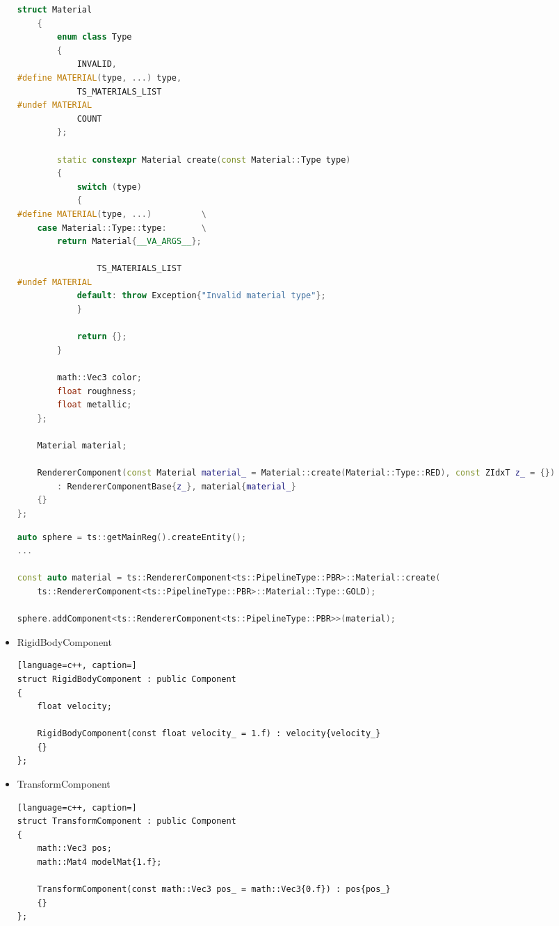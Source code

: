 \begin{itemize}
\begin{lstlisting}[language=c++, caption=Renderer PBR Component struct (./engine/include/tsengine/ecs/components/renderer\_component.h)]
    struct Material
    {
        enum class Type
        {
            INVALID,
#define MATERIAL(type, ...) type, 
            TS_MATERIALS_LIST
#undef MATERIAL
            COUNT
        };

        static constexpr Material create(const Material::Type type)
        {
            switch (type)
            {
#define MATERIAL(type, ...)          \
    case Material::Type::type:       \
        return Material{__VA_ARGS__};

                TS_MATERIALS_LIST
#undef MATERIAL
            default: throw Exception{"Invalid material type"};
            }

            return {};
        }

        math::Vec3 color;
        float roughness;
        float metallic;
    };

    Material material;

    RendererComponent(const Material material_ = Material::create(Material::Type::RED), const ZIdxT z_ = {})
        : RendererComponentBase{z_}, material{material_}
    {}
};
\end{lstlisting}

\label{lst:renderer_component_pbr}
\begin{lstlisting}[language=c++, caption=Process of adding PBR Renderer Component with material (./game/game.cpp)]
auto sphere = ts::getMainReg().createEntity();
...

const auto material = ts::RendererComponent<ts::PipelineType::PBR>::Material::create(
    ts::RendererComponent<ts::PipelineType::PBR>::Material::Type::GOLD);

sphere.addComponent<ts::RendererComponent<ts::PipelineType::PBR>>(material);
\end{lstlisting}

    \item RigidBodyComponent\\
\begin{lstlisting}[language=c++, caption=]
struct RigidBodyComponent : public Component
{
    float velocity;

    RigidBodyComponent(const float velocity_ = 1.f) : velocity{velocity_}
    {}
};
\end{lstlisting}
    \item TransformComponent\\
\begin{lstlisting}[language=c++, caption=]
struct TransformComponent : public Component
{
    math::Vec3 pos;
    math::Mat4 modelMat{1.f};

    TransformComponent(const math::Vec3 pos_ = math::Vec3{0.f}) : pos{pos_}
    {}
};
\end{lstlisting}
\end{itemize}

